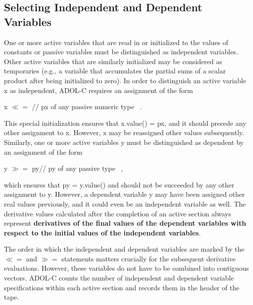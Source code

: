 \documentclass[11pt,twoside]{article}
\begin{document}
\subsection{Selecting Independent and Dependent Variables}
%
One or more active variables that are read in or initialized to
the values of constants or passive variables must be distinguished as
independent variables. Other active variables that are similarly 
initialized may be considered as temporaries (e.g., a variable that
accumulates the partial sums of a scalar product after being 
initialized to zero). In order to distinguish an active variable {\sf x} as
independent, ADOL-C requires an assignment of the form
\begin{center}
{\sf x} \boldmath $\ll=$ \hspace{0.2in}// {\sf px} of any passive numeric type $\enspace .$
\end{center}
This special initialization ensures that {\sf x.value()} = {\sf px}, and it should
precede any other assignment to {\sf x}. However, {\sf x} may be reassigned
other values subsequently. Similarly, one or more active variables {\sf y}
must be distinguished as dependent by an assignment of the form
\begin{center}
{\sf y \boldmath $\gg=$ \unboldmath py}\hspace{0.2in}// {\sf py} of any  passive type $\enspace ,$ 
\end{center}
which ensures that {\sf py} = {\sf y.value()} and should not be succeeded 
by any other assignment to {\sf y}. However, a dependent variable {\sf y} 
may have been assigned other real values previously, and it could even be an 
independent variable as well.  The derivative values calculated after
the
completion of an active section always represent {\bf derivatives of the final 
values of the dependent variables with respect to the initial values of the
independent variables}. 

The order in which the independent and dependent variables are marked
by the \boldmath $\ll=$ \unboldmath and \boldmath $\gg=$ \unboldmath statements matters crucially for the subsequent
derivative evaluations. However, these variables do not have to be
combined into contiguous vectors. ADOL-C counts the number of
independent and dependent variable specifications within each active
section and records them in the header of the tape.
%
\end{document}
